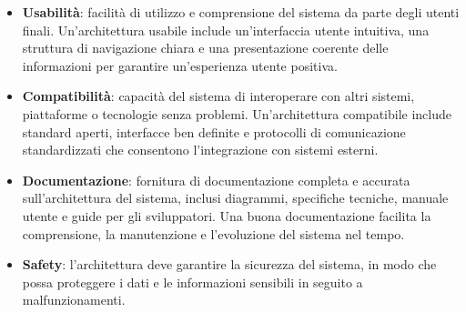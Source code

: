 \begin{itemize}
	\item \textbf{Usabilità}: facilità di utilizzo e comprensione del sistema da parte degli utenti finali. Un'architettura usabile include un'interfaccia utente intuitiva, una struttura di navigazione chiara e una presentazione coerente delle informazioni per garantire un'esperienza utente positiva.
	\item \textbf{Compatibilità}: capacità del sistema di interoperare con altri sistemi, piattaforme o tecnologie senza problemi. Un'architettura compatibile include standard aperti, interfacce ben definite e protocolli di comunicazione standardizzati che consentono l'integrazione con sistemi esterni.
	\item \textbf{Documentazione}: fornitura di documentazione completa e accurata sull'architettura del sistema, inclusi diagrammi, specifiche tecniche, manuale utente e guide per gli sviluppatori. Una buona documentazione facilita la comprensione, la manutenzione e l'evoluzione del sistema nel tempo.
	\item \textbf{Safety}: l'architettura deve garantire la sicurezza del sistema, in modo che possa proteggere i dati e le informazioni sensibili in seguito a malfunzionamenti.
\end{itemize}

